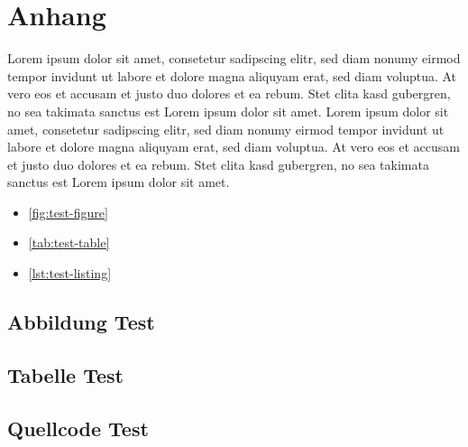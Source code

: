 \thispagestyle{plain}

\section{Anhang}\label{apdx}

Lorem ipsum dolor sit amet, consetetur sadipscing elitr, sed diam nonumy eirmod tempor invidunt ut labore et dolore magna aliquyam erat, sed diam voluptua. At vero eos et accusam et justo duo dolores et ea rebum. Stet clita kasd gubergren, no sea takimata sanctus est Lorem ipsum dolor sit amet. Lorem ipsum dolor sit amet, consetetur sadipscing elitr, sed diam nonumy eirmod tempor invidunt ut labore et dolore magna aliquyam erat, sed diam voluptua. At vero eos et accusam et justo duo dolores et ea rebum. Stet clita kasd gubergren, no sea takimata sanctus est Lorem ipsum dolor sit amet.

\begin{itemize}
    \item \autoref{fig:test-figure}
    \item \autoref{tab:test-table}
    \item \autoref{lst:test-listing}
\end{itemize}

\subsection{Abbildung Test}\label{apdx:figures}


\clearpage

\subsection{Tabelle Test}\label{apdx:tables}


\clearpage

\subsection{Quellcode Test}\label{apdx:listings}


\clearpage